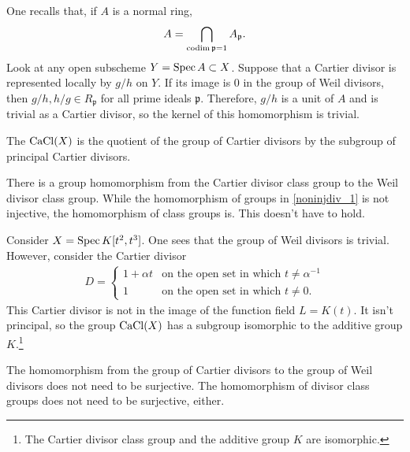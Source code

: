 \documentclass [11 pt, oneside] {article}
\begin{document}
One recalls that, if $A$ is a normal ring,
\begin{align*}
	A = \bigcap_{\operatorname{codim}\mathfrak{p} =1} A_{\mathfrak{p}}.
\end{align*}
Look at any open subscheme $Y=\operatorname{Spec} A\subset X$. Suppose that a Cartier divisor is represented locally by $g/h$ on $Y$. If its image is $0$ in the group of Weil divisors, then $g/h,h/g\in R_{\mathfrak{p}}$ for all prime ideals $\mathfrak{p}$. Therefore, $g/h$ is a unit of $A$ and is trivial as a Cartier divisor, so the kernel of this homomorphism is trivial.

\begin{definition}[ ]\label{}\text{}
The  $\operatorname{CaCl}(X)$ is the quotient of the group of Cartier divisors by the subgroup of principal Cartier divisors.
\end{definition}

There is a group homomorphism from the Cartier divisor class group to the Weil divisor class group. While the homomorphism of groups in \cref{noninjdiv_1} is not injective, the homomorphism of class groups is. This doesn't have to hold.

\begin{example}[ ]\label{}\text{}
Consider $X=\operatorname{Spec} K[t^2,t^3]$. One sees that the group of Weil divisors is trivial. However, consider the Cartier divisor
\begin{align*}
	D=
	\begin{cases}
		1+\alpha t &\textrm{on the open set in which $t\ne \alpha^{-1}$}\\
			1 &\textrm{on the open set in which $t\ne 0$.}
	\end{cases}
\end{align*}
This Cartier divisor is not in the image of the function field $L= K(t)$. It isn't principal, so the group $\operatorname{CaCl}(X)$ has a subgroup isomorphic to the additive group $K$.\footnote{The Cartier divisor class group and the additive group $K$ are isomorphic.}
\end{example}

The homomorphism from the group of Cartier divisors to the group of Weil divisors does not need to be surjective. The homomorphism of divisor class groups does not need to be surjective, either.
\end{document}
